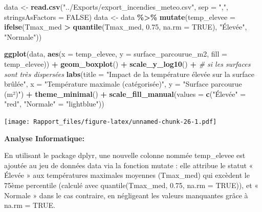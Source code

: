 \documentclass[
]{article}
\newenvironment{Shaded}{\begin{snugshade}}{\end{snugshade}}
\newcommand{\AttributeTok}[1]{\textcolor[rgb]{0.13,0.29,0.53}{#1}}
\newcommand{\CommentTok}[1]{\textcolor[rgb]{0.56,0.35,0.01}{\textit{#1}}}
\newcommand{\ConstantTok}[1]{\textcolor[rgb]{0.56,0.35,0.01}{#1}}
\newcommand{\FloatTok}[1]{\textcolor[rgb]{0.00,0.00,0.81}{#1}}
\newcommand{\FunctionTok}[1]{\textcolor[rgb]{0.13,0.29,0.53}{\textbf{#1}}}
\newcommand{\NormalTok}[1]{#1}
\newcommand{\OtherTok}[1]{\textcolor[rgb]{0.56,0.35,0.01}{#1}}
\newcommand{\SpecialCharTok}[1]{\textcolor[rgb]{0.81,0.36,0.00}{\textbf{#1}}}
\newcommand{\StringTok}[1]{\textcolor[rgb]{0.31,0.60,0.02}{#1}}
\begin{document}
\begin{Shaded}
\begin{Highlighting}[]
\NormalTok{data }\OtherTok{\textless{}{-}} \FunctionTok{read.csv}\NormalTok{(}\StringTok{"../Exports/export\_incendies\_meteo.csv"}\NormalTok{, }\AttributeTok{sep =} \StringTok{","}\NormalTok{, }\AttributeTok{stringsAsFactors =} \ConstantTok{FALSE}\NormalTok{)}
\NormalTok{data }\OtherTok{\textless{}{-}}\NormalTok{ data }\SpecialCharTok{\%\textgreater{}\%}
  \FunctionTok{mutate}\NormalTok{(}\AttributeTok{temp\_elevee =} \FunctionTok{ifelse}\NormalTok{(Tmax\_med }\SpecialCharTok{\textgreater{}} \FunctionTok{quantile}\NormalTok{(Tmax\_med, }\FloatTok{0.75}\NormalTok{, }\AttributeTok{na.rm =} \ConstantTok{TRUE}\NormalTok{), }\StringTok{"Élevée"}\NormalTok{, }\StringTok{"Normale"}\NormalTok{))}

\FunctionTok{ggplot}\NormalTok{(data, }\FunctionTok{aes}\NormalTok{(}\AttributeTok{x =}\NormalTok{ temp\_elevee, }\AttributeTok{y =}\NormalTok{ surface\_parcourue\_m2, }\AttributeTok{fill =}\NormalTok{ temp\_elevee)) }\SpecialCharTok{+}
  \FunctionTok{geom\_boxplot}\NormalTok{() }\SpecialCharTok{+}
  \FunctionTok{scale\_y\_log10}\NormalTok{() }\SpecialCharTok{+}  \CommentTok{\# si les surfaces sont très dispersées}
  \FunctionTok{labs}\NormalTok{(}\AttributeTok{title =} \StringTok{"Impact de la température élevée sur la surface brûlée"}\NormalTok{,}
       \AttributeTok{x =} \StringTok{"Température maximale (catégorisée)"}\NormalTok{,}
       \AttributeTok{y =} \StringTok{"Surface parcourue (m²)"}\NormalTok{) }\SpecialCharTok{+}
  \FunctionTok{theme\_minimal}\NormalTok{() }\SpecialCharTok{+}
  \FunctionTok{scale\_fill\_manual}\NormalTok{(}\AttributeTok{values =} \FunctionTok{c}\NormalTok{(}\StringTok{"Élevée"} \OtherTok{=} \StringTok{"red"}\NormalTok{, }\StringTok{"Normale"} \OtherTok{=} \StringTok{"lightblue"}\NormalTok{))}
\end{Highlighting}
\end{Shaded}

\texttt{[image: Rapport\_files/figure-latex/unnamed-chunk-26-1.pdf]}

\textbf{Analyse Informatique:}

En utilisant le package dplyr, une nouvelle colonne nommée temp\_elevee
est ajoutée au jeu de données data via la fonction mutate : elle
attribue le statut « Élevée » aux températures maximales moyennes
(Tmax\_med) qui excèdent le 75ème percentile (calculé avec
quantile(Tmax\_med, 0.75, na.rm = TRUE)), et « Normale » dans le cas
contraire, en négligeant les valeurs manquantes grâce à na.rm = TRUE.
\end{document}
